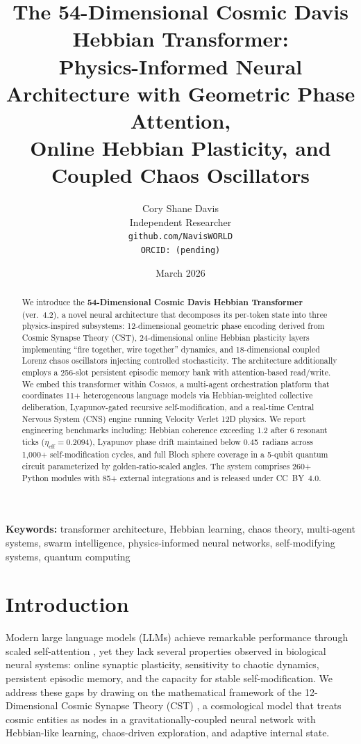 \documentclass[11pt,a4paper]{article}
\title{%
    The 54-Dimensional Cosmic Davis Hebbian Transformer:\\
    Physics-Informed Neural Architecture with Geometric Phase Attention,\\
    Online Hebbian Plasticity, and Coupled Chaos Oscillators%
}
\author{
    Cory Shane Davis\\
    Independent Researcher\\
    \texttt{github.com/NavisWORLD}\\
    \texttt{ORCID: (pending)}
}
\date{March 2026}
\begin{document}
\maketitle

\begin{abstract}
We introduce the \textbf{54-Dimensional Cosmic Davis Hebbian Transformer} (ver.~4.2), a novel neural architecture that decomposes its per-token state into three physics-inspired subsystems: 12-dimensional geometric phase encoding derived from Cosmic Synapse Theory (CST), 24-dimensional online Hebbian plasticity layers implementing ``fire together, wire together'' dynamics, and 18-dimensional coupled Lorenz chaos oscillators injecting controlled stochasticity. The architecture additionally employs a 256-slot persistent episodic memory bank with attention-based read/write. We embed this transformer within \textsc{Cosmos}, a multi-agent orchestration platform that coordinates 11+ heterogeneous language models via Hebbian-weighted collective deliberation, Lyapunov-gated recursive self-modification, and a real-time Central Nervous System (CNS) engine running Velocity Verlet 12D physics. We report engineering benchmarks including: Hebbian coherence exceeding 1.2 after 6 resonant ticks ($\eta_{\text{eff}} = 0.2094$), Lyapunov phase drift maintained below 0.45~radians across 1{,}000+ self-modification cycles, and full Bloch sphere coverage in a 5-qubit quantum circuit parameterized by golden-ratio-scaled angles. The system comprises 260+ Python modules with 85+ external integrations and is released under CC~BY~4.0.
\end{abstract}

\noindent\textbf{Keywords:} transformer architecture, Hebbian learning, chaos theory, multi-agent systems, swarm intelligence, physics-informed neural networks, self-modifying systems, quantum computing

\section{Introduction}
\label{sec:intro}

Modern large language models (LLMs) achieve remarkable performance through scaled self-attention \citep{vaswani2017attention}, yet they lack several properties observed in biological neural systems: online synaptic plasticity, sensitivity to chaotic dynamics, persistent episodic memory, and the capacity for stable self-modification. We address these gaps by drawing on the mathematical framework of the 12-Dimensional Cosmic Synapse Theory (CST) \citep{davis2024cst}, a cosmological model that treats cosmic entities as nodes in a gravitationally-coupled neural network with Hebbian-like learning, chaos-driven exploration, and adaptive internal state.
\end{document}
